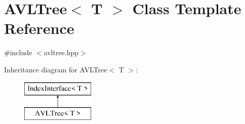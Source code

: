 \hypertarget{classAVLTree}{}\section{A\+V\+L\+Tree$<$ T $>$ Class Template Reference}
\label{classAVLTree}


{\ttfamily \#include $<$avltree.\+hpp$>$}

Inheritance diagram for A\+V\+L\+Tree$<$ T $>$\+:\begin{figure}[H]
\begin{center}
\leavevmode
\includegraphics[height=2.000000cm]{classAVLTree}
\end{center}
\end{figure}
